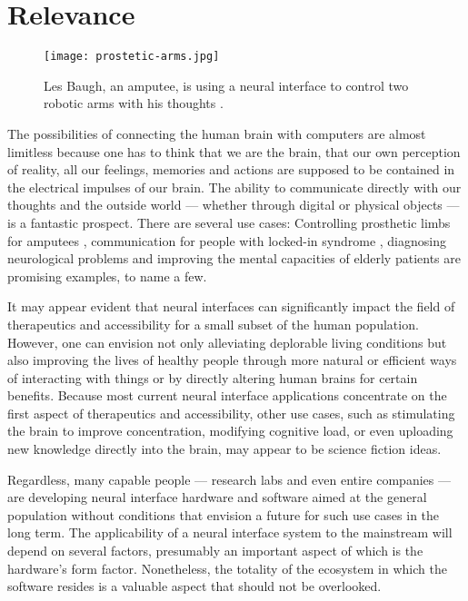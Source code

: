 \section{Relevance}
\label{chapter1-relevance}

\begin{figure}
  \centering
  \texttt{[image: prostetic-arms.jpg]}
  \caption{Les Baugh, an amputee, is using a neural interface to control two robotic arms with his thoughts \citep{campbell_amputee_2014}.}
  \label{fig:prostetic-arms}
\end{figure}

The possibilities of connecting the human brain with computers are almost limitless because one has to think that we are the brain, that our own perception of reality, all our feelings, memories and actions are supposed to be contained in the electrical impulses of our brain. The ability to communicate directly with our thoughts and the outside world — whether through digital or physical objects — is a fantastic prospect. There are several use cases: Controlling prosthetic limbs for amputees \citep{murphy_electroencephalogram-based_2017}, communication for people with locked-in syndrome \citep{chaudhary_spelling_2022}, diagnosing neurological problems and improving the mental capacities of elderly patients \citep{belkacem_brain_2020} are promising examples, to name a few.

It may appear evident that neural interfaces can significantly impact the field of therapeutics and accessibility for a small subset of the human population. However, one can envision not only alleviating deplorable living conditions but also improving the lives of healthy people through more natural or efficient ways of interacting with things or by directly altering human brains for certain benefits. Because most current neural interface applications concentrate on the first aspect of therapeutics and accessibility, other use cases, such as stimulating the brain to improve concentration, modifying cognitive load, or even uploading new knowledge directly into the brain, may appear to be science fiction ideas.

Regardless, many capable people — research labs and even entire companies — are developing neural interface hardware and software aimed at the general population without conditions that envision a future for such use cases in the long term. The applicability of a neural interface system to the mainstream will depend on several factors, presumably an important aspect of which is the hardware's form factor. Nonetheless, the totality of the ecosystem in which the software resides is a valuable aspect that should not be overlooked.

